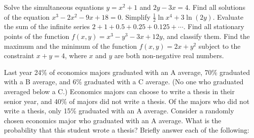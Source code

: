 \documentclass[addpoints,12pt,a4paper]{exam}
\begin{document}
\begin{questions}

\question Solve the simultaneous equations $y = x^2 + 1$ and $2y - 3x = 4$.
\question Find all solutions of the equation $x^3 - 2x^2 - 9x + 18 = 0$.
\question Simplify $\frac{1}{2}\ln x^4 + 3\ln(2y)$.
\question Evaluate the sum of the infinite series $2 + 1 + 0.5 + 0.25 + 0.125 + \cdots$.
\question Find all stationary points of the function $f(x,y) = x^3 - y^3 - 3x + 12y$, and classify them.
\question Find the maximum and the minimum of the function $f(x,y) = 2x + y^2$ subject to the constraint $x + y = 4$, where $x$ and $y$ are both non-negative real numbers.



\item Last year 24\% of economics majors graduated with an A average, 70\% graduated with a B average, and 6\% graduated with a C average. (No one who graduated averaged below a C.) Economics majors can choose to write a thesis in their senior year, and 40\% of majors did not write a thesis. Of the majors who did not write a thesis, only 15\% graduated with an A average. Consider a randomly chosen economics major who graduated with an A average. What is the probability that this student wrote a thesis?
\question Briefly answer each of the following:



\end{questions}
\end{document}

